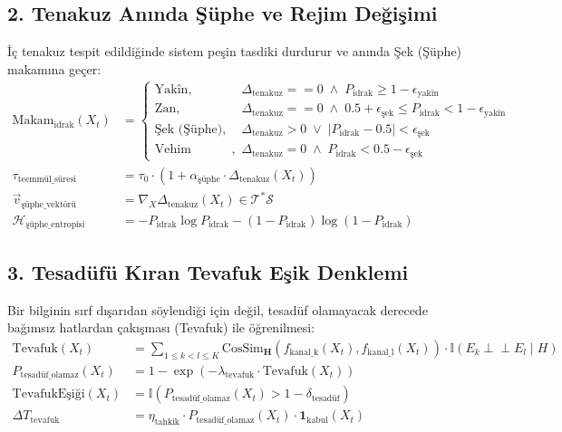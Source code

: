 \documentclass[11pt, a4paper]{article}
\begin{document}
\subsection{2. Tenakuz Anında Şüphe ve Rejim Değişimi}
İç tenakuz tespit edildiğinde sistem peşin tasdiki durdurur ve anında Şek (Şüphe) makamına geçer:
\begin{align}
\text{Makam}_{\text{idrak}}(X_t) &= 
\begin{cases}
\text{Yakîn}, & \Delta_{\text{tenakuz}} == 0 \;\land\; P_{\text{idrak}} \ge 1 - \epsilon_{\text{yakîn}} \\
\text{Zan}, & \Delta_{\text{tenakuz}} == 0 \;\land\; 0.5 + \epsilon_{\text{şek}} \le P_{\text{idrak}} < 1 - \epsilon_{\text{yakîn}} \\
\text{Şek (Şüphe)}, & \Delta_{\text{tenakuz}} > 0 \;\lor\; |P_{\text{idrak}} - 0.5| < \epsilon_{\text{şek}} \\
\text{Vehim (aleyhte zan)}, & \Delta_{\text{tenakuz}} = 0 \;\land\; P_{\text{idrak}} < 0.5 - \epsilon_{\text{şek}}
\end{cases} \\
\tau_{\text{teemmül\_süresi}} &= \tau_0 \cdot \left( 1 + \alpha_{\text{şüphe}} \cdot \Delta_{\text{tenakuz}}(X_t) \right) \\
\vec{v}_{\text{şüphe\_vektörü}} &= \nabla_{X} \Delta_{\text{tenakuz}}(X_t) \in \mathcal{T}^*\mathcal{S} \\
\mathcal{H}_{\text{şüphe\_entropisi}} &= -P_{\text{idrak}} \log P_{\text{idrak}} - (1 - P_{\text{idrak}}) \log (1 - P_{\text{idrak}})
\end{align}

\subsection{3. Tesadüfü Kıran Tevafuk Eşik Denklemi}
Bir bilginin sırf dışarıdan söylendiği için değil, tesadüf olamayacak derecede bağımsız hatlardan çakışması (Tevafuk) ile öğrenilmesi:
\begin{align}
\text{Tevafuk}(X_t) &= \sum_{1 \le k < l \le K} \text{CosSim}_{\mathbf{H}}\left( f_{\text{kanal\_k}}(X_t), f_{\text{kanal\_l}}(X_t) \right) \cdot \mathbb{I}\left( E_k \perp\!\!\!\perp E_l \mid H \right) \\
P_{\text{tesadüf\_olamaz}}(X_t) &= 1 - \exp\left( -\lambda_{\text{tevafuk}} \cdot \text{Tevafuk}(X_t) \right) \\
\text{TevafukEşiği}(X_t) &= \mathbb{I}\left( P_{\text{tesadüf\_olamaz}}(X_t) > 1 - \delta_{\text{tesadüf}} \right) \\
\Delta T_{\text{tevafuk}} &= \eta_{\text{tahkik}} \cdot P_{\text{tesadüf\_olamaz}}(X_t) \cdot \mathbf{1}_{\text{kabul}}(X_t)
\end{align}
\end{document}
